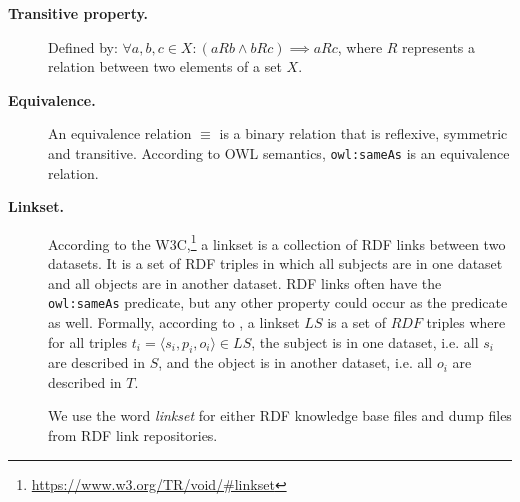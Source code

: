 \begin{description}


\item[\textbf{Transitive property.}] Defined by: $\forall a,b,c \in X:(aRb \wedge bRc) \implies aRc$, where $R$ represents a relation between two elements of a set $X$.


\item[\textbf{Equivalence.}] An equivalence relation $\equiv$ is a binary relation that is reflexive, symmetric and transitive. According to OWL semantics, \texttt{owl:sameAs} is an equivalence relation.

\item[\textbf{Linkset.}]
According to the W3C,\footnote{\url{https://www.w3.org/TR/void/\#linkset}} a linkset is a collection of RDF links between two datasets. It is a set of RDF triples in which all subjects are in one dataset and all objects are in another dataset. RDF links often have the \texttt{owl:sameAs} predicate, but any other property could occur as the predicate as well.
Formally, according to \cite{alexander2009describing}, a linkset $LS$ is a set of $RDF$ triples where for all triples $t_i =  \langle s_i, p_i, o_i \rangle \in LS$,  the subject is in one dataset,  i.e. all $s_i$ are described in $S$, and the object is in another dataset, i.e. all $o_i$ are described in $T$.

We use the word \emph{linkset} for either RDF knowledge base files and dump files from RDF link repositories.


\end{description}
